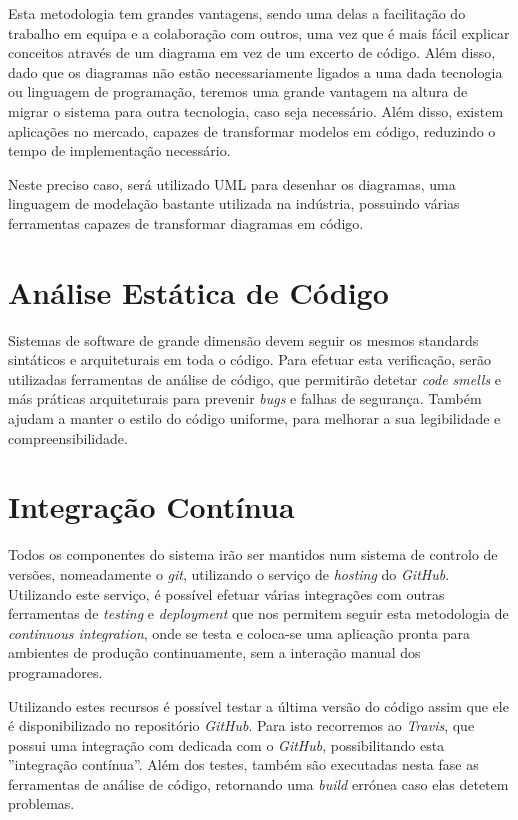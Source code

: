 Esta metodologia tem grandes vantagens, sendo uma delas a facilitação do trabalho em equipa e a colaboração com outros, uma vez que é mais fácil explicar conceitos através de um diagrama em vez de um excerto de código. Além disso, dado que os diagramas não estão necessariamente ligados a uma dada tecnologia ou linguagem de programação, teremos uma grande vantagem na altura de migrar o sistema para outra tecnologia, caso seja necessário. Além disso, existem aplicações no mercado, capazes de transformar modelos em código, reduzindo o tempo de implementação necessário.

Neste preciso caso, será utilizado UML para desenhar os diagramas, uma linguagem de modelação bastante utilizada na indústria, possuindo várias ferramentas capazes de transformar diagramas em código.

\section{Análise Estática de Código}

Sistemas de software de  grande dimensão devem seguir os mesmos standards sintáticos e arquiteturais em toda o código. Para efetuar esta verificação, serão utilizadas ferramentas de análise de código, que permitirão detetar \textit{code smells} e más práticas arquiteturais para prevenir \textit{bugs} e falhas de segurança. Também ajudam a manter o estilo do código uniforme, para melhorar a sua legibilidade e compreensibilidade.

\section{Integração Contínua}

Todos os componentes do sistema irão ser mantidos num sistema de controlo de versões, nomeadamente o \textit{git}, utilizando o serviço de \textit{hosting} do \textit{GitHub}. Utilizando este serviço, é possível efetuar várias integrações com outras ferramentas de \textit{testing} e \textit{deployment} que nos permitem seguir esta metodologia de \textit{continuous integration}, onde se testa e coloca-se uma aplicação pronta para ambientes de produção continuamente, sem a interação manual dos programadores.

Utilizando estes recursos é possível testar a última versão do código assim que ele é disponibilizado no repositório \textit{GitHub}. Para isto recorremos ao \textit{Travis}, que possui uma integração com dedicada com o \textit{GitHub}, possibilitando esta ''integração contínua''. Além dos testes, também são executadas nesta fase as ferramentas de análise de código, retornando uma \textit{build} errónea caso elas detetem problemas.

